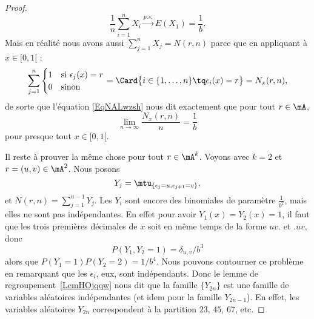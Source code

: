 \begin{proof}
	\begin{equation}    \label{EqNALwzsh}
		\frac{1}{n }\sum_{i=1}^nX_i\stackrel{p.s.}{\longrightarrow}E(X_1)=\frac{1}{ b }.
	\end{equation}
	Mais en réalité nous avons aussi \( \sum_{j=1}^nX_j=N(r,n)\) parce que en appliquant à \( x\in\mathopen[ 0 , 1 [\) :
	\begin{equation}
		\sum_{j=1}^n\begin{cases}
			1 & \text{si } \epsilon_j(x)=r \\
			0 & \text{sinon}
		\end{cases}
		=
		\Card\big\{  i\in\{ 1,\ldots, n \}\tq \epsilon_i(x)=r \big\}=N_x(r,n),
	\end{equation}
	de sorte que l'équation \eqref{EqNALwzsh} nous dit exactement que pour tout \( r\in \mA\),
	\begin{equation}
		\lim_{n\to \infty} \frac{ N_x(r,n) }{ n }=\frac{1}{ b }
	\end{equation}
	pour presque tout \( x\in\mathopen[ 0 , 1 [\).

	Il reste à prouver la même chose pour tout \( r\in\mA^k\). Voyons avec \( k=2\) et \( r=(u,v)\in\mA^2\). Nous posons
	\begin{equation}
		Y_j=\mtu_{\{ \epsilon_j=u,\epsilon_{j+1}=v \}},
	\end{equation}
	et \( N(r,n)=\sum_{j=1}^{n-1}Y_j\). Les \( Y_i\) sont encore des binomiales de paramètre \( \frac{1}{ b^2 }\), mais elles ne sont pas indépendantes. En effet pour avoir \( Y_1(x)=Y_2(x)=1\), il faut que les trois premières décimales de \( x\) soit en même temps de la forme \( uv.\) et \( .uv\), donc
	\begin{equation}
		P(Y_1,Y_2=1)=\delta_{u,v}/b^3
	\end{equation}
	alors que \( P(Y_1=1)P(Y_2=2)=1/b^4\). Nous pouvons contourner ce problème en remarquant que les \( \epsilon_i\), eux, sont indépendants. Donc le lemme de regroupement~\ref{LemHOjqqw} nous dit que la famille \( \{ Y_{2n} \} \) est une famille de variables aléatoires indépendantes (et idem pour la famille \( Y_{2n-1}\)). En effet, les variables aléatoires \( Y_{2n}\) correspondent à la partition \( 23\), \( 45\), \( 67\), etc.


\end{proof}
